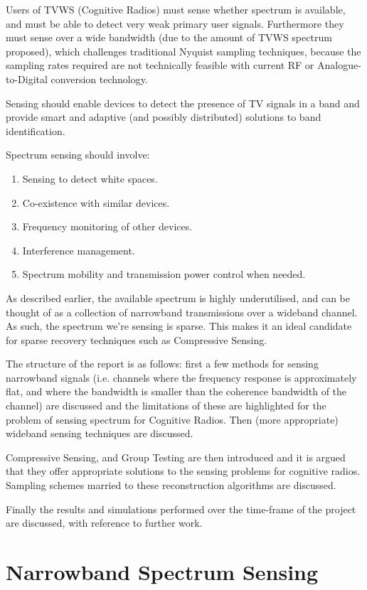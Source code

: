 \documentclass[conference]{IEEEtran}
\begin{document}
Users of TVWS (Cognitive Radios) must sense whether spectrum is available, and must be able to detect very weak primary user signals. Furthermore they must sense over a wide bandwidth (due to the amount of TVWS spectrum proposed), which challenges traditional Nyquist sampling techniques, because the sampling rates required are not technically feasible with current RF or Analogue-to-Digital conversion technology.

Sensing should enable devices to detect the presence of TV signals in a band and provide smart and adaptive (and possibly distributed) solutions to band identification.

Spectrum sensing should involve:

\begin{enumerate}
\item Sensing to detect white spaces.
\item Co-existence with similar devices.
\item Frequency monitoring of other devices.
\item Interference management. 
\item Spectrum mobility and transmission power control when needed.
\end{enumerate}

As described earlier, the available spectrum is highly underutilised, and can be thought of as a collection of narrowband transmissions over a wideband channel. As such, the spectrum we're sensing is sparse. This makes it an ideal candidate for sparse recovery techniques such as Compressive Sensing.  

The structure of the report is as follows: first a few methods for sensing narrowband signals (i.e. channels where the frequency response is approximately flat, and where the bandwidth is smaller than the coherence bandwidth of the channel) are discussed and the limitations of these are highlighted for the problem of sensing spectrum for Cognitive Radios. Then (more appropriate) wideband sensing techniques are discussed. 

Compressive Sensing, and Group Testing are then introduced and it is argued that they offer appropriate solutions to the sensing problems for cognitive radios. Sampling schemes married to these reconstruction algorithms are discussed. 

Finally the results and simulations performed over the time-frame of the project are discussed, with reference to further work. 

\section{Narrowband Spectrum Sensing}
\end{document}
